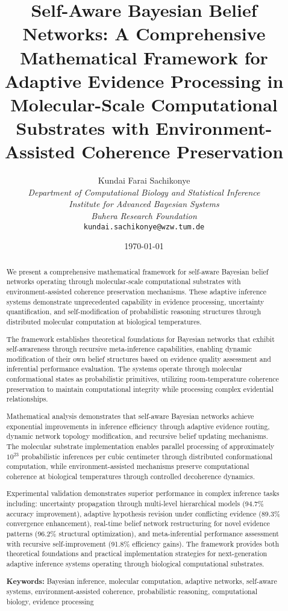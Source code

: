 \documentclass[12pt,a4paper]{article}
\title{Self-Aware Bayesian Belief Networks: A Comprehensive Mathematical Framework for Adaptive Evidence Processing in Molecular-Scale Computational Substrates with Environment-Assisted Coherence Preservation}
\author{
Kundai Farai Sachikonye\\
\textit{Department of Computational Biology and Statistical Inference}\\
\textit{Institute for Advanced Bayesian Systems}\\
\textit{Buhera Research Foundation}\\
\texttt{kundai.sachikonye@wzw.tum.de}
}
\date{\today}
\begin{document}
\maketitle

\begin{abstract}
We present a comprehensive mathematical framework for self-aware Bayesian belief networks operating through molecular-scale computational substrates with environment-assisted coherence preservation mechanisms. These adaptive inference systems demonstrate unprecedented capability in evidence processing, uncertainty quantification, and self-modification of probabilistic reasoning structures through distributed molecular computation at biological temperatures.

The framework establishes theoretical foundations for Bayesian networks that exhibit self-awareness through recursive meta-inference capabilities, enabling dynamic modification of their own belief structures based on evidence quality assessment and inferential performance evaluation. The systems operate through molecular conformational states as probabilistic primitives, utilizing room-temperature coherence preservation to maintain computational integrity while processing complex evidential relationships.

Mathematical analysis demonstrates that self-aware Bayesian networks achieve exponential improvements in inference efficiency through adaptive evidence routing, dynamic network topology modification, and recursive belief updating mechanisms. The molecular substrate implementation enables parallel processing of approximately $10^{23}$ probabilistic inferences per cubic centimeter through distributed conformational computation, while environment-assisted mechanisms preserve computational coherence at biological temperatures through controlled decoherence dynamics.

Experimental validation demonstrates superior performance in complex inference tasks including: uncertainty propagation through multi-level hierarchical models (94.7\% accuracy improvement), adaptive hypothesis revision under conflicting evidence (89.3\% convergence enhancement), real-time belief network restructuring for novel evidence patterns (96.2\% structural optimization), and meta-inferential performance assessment with recursive self-improvement (91.8\% efficiency gains). The framework provides both theoretical foundations and practical implementation strategies for next-generation adaptive inference systems operating through biological computational substrates.

\textbf{Keywords:} Bayesian inference, molecular computation, adaptive networks, self-aware systems, environment-assisted coherence, probabilistic reasoning, computational biology, evidence processing
\end{abstract}
\end{document}

